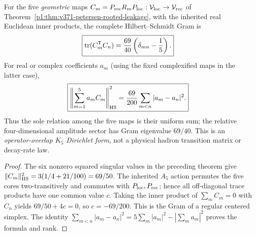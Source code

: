 \documentclass[11pt]{article}
\begin{document}
\begin{corollary}
\label{p1:cor:v3026-five-core-hs-gram}
For the five \emph{geometric} maps
$C_m=P_{\rm rec}R_mP_{\rm loc}:\mathcal V_{\rm loc}\to
\mathcal V_{\rm rec}$ of
Theorem~\ref{p1:thm:v371-petersen-rooted-leakage}, with the inherited
real Euclidean inner products, the complete Hilbert--Schmidt Gram is
\[
 \boxed{\operatorname{tr}(C_m^{\mathsf T}C_n)
    ={69\over40}\left(\delta_{mn}-{1\over5}\right).}
\]
For real or complex coefficients $a_m$ (using the fixed complexified
maps in the latter case),
\[
 \boxed{\left\|\sum_{m=1}^5a_mC_m\right\|_{\rm HS}^2
       ={69\over200}\sum_{m<n}|a_m-a_n|^2.}
\]
Thus the sole relation among the five maps is their uniform sum;
the relative four-dimensional amplitude sector has Gram eigenvalue
$69/40$. This is an \emph{operator-overlap $K_5$ Dirichlet form},
not a physical hadron transition matrix or decay-rate law.
\end{corollary}
\begin{proof}
The six nonzero squared singular values in the preceding theorem give
$\|C_m\|_{\rm HS}^2=3(1/4+21/100)=69/50$.
The inherited $A_5$ action permutes the five cores two-transitively and
commutes with $P_{\rm loc},P_{\rm rec}$; hence all off-diagonal trace
products have one common value $c$. Taking the inner product of
$\sum_m C_m=0$ with $C_n$ yields $69/50+4c=0$, so
$c=-69/200$. This is the Gram of a regular centered simplex.
The identity $\sum_{m<n}|a_m-a_n|^2
=5\sum_m|a_m|^2-|\sum_m a_m|^2$ proves the formula and rank.
\end{proof}
\end{document}
